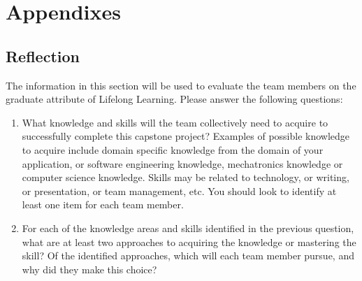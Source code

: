 \documentclass{article}
\begin{document}
\section{Appendixes}

\subsection{Reflection}

The information in this section will be used to evaluate the team members on the
graduate attribute of Lifelong Learning.  Please answer the following questions:

\begin{enumerate}
    \item What knowledge and skills will the team collectively need to acquire to
          successfully complete this capstone project?  Examples of possible knowledge
          to acquire include domain specific knowledge from the domain of your
          application, or software engineering knowledge, mechatronics knowledge or
          computer science knowledge.  Skills may be related to technology, or writing,
          or presentation, or team management, etc.  You should look to identify at
          least one item for each team member.
    \item For each of the knowledge areas and skills identified in the previous
          question, what are at least two approaches to acquiring the knowledge or
          mastering the skill?  Of the identified approaches, which will each team
          member pursue, and why did they make this choice?
\end{enumerate}
\end{document}
